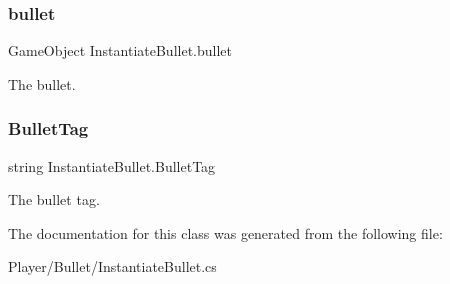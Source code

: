 \subsubsection{\texorpdfstring{bullet}{bullet}}
{\footnotesize\ttfamily Game\+Object Instantiate\+Bullet.\+bullet}



The bullet. 

\mbox{\label{class_instantiate_bullet_a3eebc503e154a693e632bf480b2209c4}} 
\subsubsection{\texorpdfstring{Bullet\+Tag}{BulletTag}}
{\footnotesize\ttfamily string Instantiate\+Bullet.\+Bullet\+Tag}



The bullet tag. 



The documentation for this class was generated from the following file\+:\begin{DoxyCompactItemize}
\item 
Player/\+Bullet/Instantiate\+Bullet.\+cs\end{DoxyCompactItemize}
